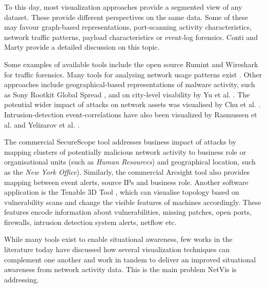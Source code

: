 To this day, most visualization approaches provide a segmented view of any dataset. These 
provide different perspectives on the same data. Some of these may favour graph-based 
representations, port-scanning activity characteristics, network traffic patterns, payload 
characteristics or event-log forensics. Conti \cite{Conti} and Marty \cite{marty2009applied} 
provide a detailed discussion on this topic. 

Some examples of available tools include the open source Rumint \cite{rumint} and Wireshark
\cite{wireshark} for traffic forensics. Many tools for analysing network usage patterns
exist \cite{best2010, RADAR, lau2004spinning, liao2010}. Other approaches include geographical-based
representations of malware activity, such as Sony Rootkit Global Spread \cite{Conti}, and on
city-level visability by Yu et al. \cite{yu2010}. The potential wider impact of attacks on network
assets was visualised by Chu et al. \cite{chu2010}. Intrusion-detection event-correlations have also
been visualized by Rasmussen et al. \cite{rasmussen2010} and Yelizarov et al. \cite{yelizarov2009}.

The commercial SecureScope tool \cite{securescope} addresses business impact of attacks by mapping
clusters of potentially malicious network activity to business role or organisational units (such as
\textit{Human Resources}) and geographical location, such as the \textit{New York Office}).
Similarly, the commercial Arcsight tool \cite{arcsight} also provides mapping between event alerts,
source IPs and business role. Another software application is the Tenable 3D Tool \cite{Tenable},
which can visualise topology based on vulnerability scans and change the visible features of
machines accordingly. These features encode information about vulnerabilities, missing patches, open
ports, firewalls, intrusion detection system alerts, netflow etc.

While many tools exist to enable situational awareness, few works in the literature today 
have discussed how several visualization techniques can complement one another and work in tandem 
to deliver an improved situational awareness from network activity data. This is the main problem 
NetVis is addressing.
